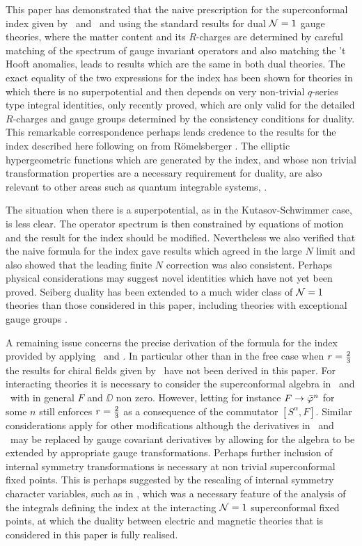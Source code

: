 
This paper has demonstrated that the naive prescription for the superconformal index 
given by \ione\ and \itwo\ and using the standard results for dual ${\cal N}=1$ gauge
theories, where the matter content and its $R$-charges are determined by
careful matching of the spectrum of gauge invariant operators and also
matching the 't Hooft anomalies, leads to results which are the same in both
dual theories. The exact equality of the two expressions for the index has been shown for 
theories in which there is no superpotential and then depends on very non-trivial 
$q$-series type integral identities, only recently proved, which are only valid for the 
detailed
$R$-charges and gauge groups determined by the consistency conditions for duality.
This remarkable correspondence perhaps lends credence to the results for the index
described here following on from  R\"omelsberger \romel.  The elliptic hypergeometric
functions which are generated by the index, and whose non trivial transformation 
properties are a necessary requirement for duality, are also relevant to other areas 
such as quantum integrable systems, \spit.

The situation when there is a superpotential, as in the  Kutasov-Schwimmer case, is less 
clear. The operator spectrum is then constrained by equations of motion and the result 
for the index should be modified.
Nevertheless we also verified that the naive formula for the index gave results which
agreed in the large $N$ limit and also showed that the leading finite $N$ correction was
also consistent.  Perhaps physical considerations may suggest novel identities
which have not yet been proved. Seiberg duality has been extended to a much
wider class of ${\cal N}=1$ theories than those considered in this paper, including theories
with exceptional gauge groups \Except.

A remaining issue concerns the precise derivation of the formula for the index
provided by applying \ione\ and \itwo. In particular other than in the free case
when $r={2\over 3}$ the results for chiral fields given by \ione\ have not been
derived in this paper. For interacting theories it is necessary to consider
the superconformal algebra in \QSfree\ and \QVfree\ with in general $F$ and $\DD$
non zero. However, letting for instance $F \to {\bar {{\varphi}}}^n$ for some $n$
still enforces $r={2\over 3}$ as a consequence of the commutator $[S^\alpha,F]$.
Similar considerations apply for other modifications although the derivatives 
in \QbarS\ and \QbarV\ may be replaced by gauge covariant derivatives by allowing
for the algebra to be extended by  appropriate gauge transformations.  Perhaps
further inclusion of internal symmetry transformations is necessary at non trivial
superconformal fixed points. This is perhaps suggested by the rescaling of internal
symmetry character variables, such as in \redefvaro, which was a necessary feature
of the analysis of the integrals defining the index at the interacting ${\cal N}=1$
superconformal fixed points, at which the duality between electric and magnetic
theories that is considered in this paper is fully realised. 


